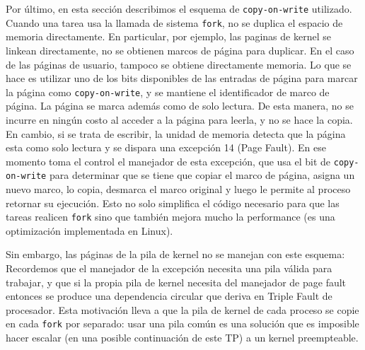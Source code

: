 Por \'ultimo, en esta secci\'on describimos el esquema de \texttt{copy-on-write} utilizado. Cuando una tarea usa la llamada de sistema
\texttt{fork}, no se duplica el espacio de memoria directamente. En particular, por ejemplo, las paginas de kernel se linkean directamente,
no se obtienen marcos de p\'agina para duplicar. En el caso de las p\'aginas de usuario, tampoco se obtiene directamente memoria. Lo que se
hace es utilizar uno de los bits disponibles de las entradas de p\'agina para marcar la p\'agina como \texttt{copy-on-write}, y se mantiene
el identificador de marco de p\'agina. La p\'agina se marca adem\'as como de solo lectura. De esta manera, no se incurre en ning\'un costo
al acceder a la p\'agina para leerla, y no se hace la copia. En cambio, si se trata de escribir, la unidad de memoria detecta que la p\'agina
esta como solo lectura y se dispara una excepci\'on 14 (Page Fault). En ese momento toma el control el manejador de esta excepci\'on, que
usa el bit de \texttt{copy-on-write} para determinar que se tiene que copiar el marco de p\'agina, asigna un nuevo marco, lo copia, desmarca
el marco original y luego le permite al proceso retornar su ejecuci\'on. Esto no solo simplifica el c\'odigo necesario para que las tareas
realicen \texttt{fork} sino que tambi\'en mejora mucho la performance (es una optimizaci\'on implementada en Linux). 

Sin embargo, las p\'aginas de la pila de kernel no se manejan con este esquema: Recordemos que el manejador de la excepci\'on necesita una
pila v\'alida para trabajar, y que si la propia pila de kernel necesita del manejador de page fault entonces se produce una dependencia
circular que deriva en Triple Fault de procesador. Esta motivaci\'on lleva a que la pila de kernel de cada proceso se copie en cada \texttt{fork} por separado: usar una pila com\'un es una soluci\'on que es imposible hacer escalar (en una posible continuaci\'on de este TP) a un kernel preempteable.
